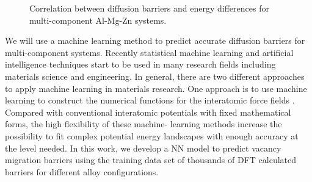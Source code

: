\begingroup
\begin{figure}[!ht]
  \centering
\caption[Correlation between diffusion barriers and energy differences for multi-component Al-Mg-Zn systems]{Correlation between diffusion barriers and energy differences for multi-component Al-Mg-Zn systems.}
  \label{Chap:Al/Vac:fig2}
\end{figure}
\endgroup


We will use a machine learning method to predict accurate diffusion barriers for multi-component systems. Recently statistical machine learning and artificial intelligence techniques start to be used in many research fields including materials science and engineering. In general, there are two different approaches to apply machine learning in materials research. One approach is to use machine learning to construct the numerical functions for the interatomic force fields \cite{bartok2010gaussian,behler2011atom,szlachta2014accuracy,artrith2016implementation,mehta2014exact,artrith2017efficient}. Compared with conventional interatomic potentials with fixed mathematical forms, the high flexibility of these machine- learning methods increase the possibility to fit complex potential energy landscapes with enough accuracy at the level needed. In this work, we develop a \ac{NN} model to predict vacancy migration barriers using the training data set of thousands of \ac{DFT} calculated barriers for different alloy configurations. 


